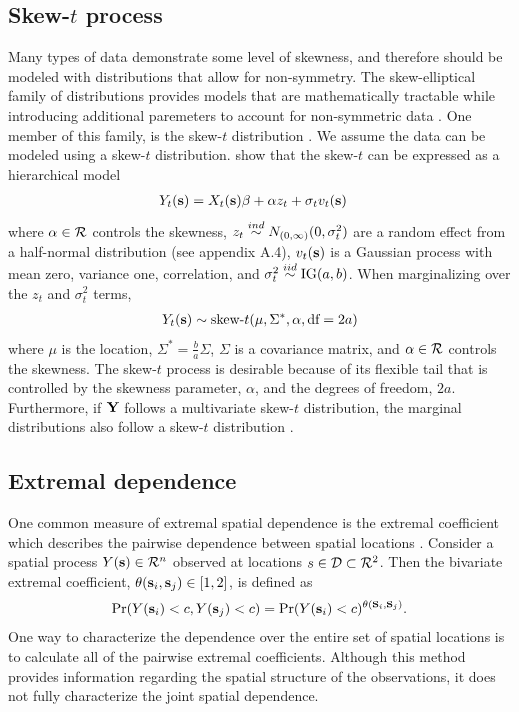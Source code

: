 \documentclass[11pt]{article}
\begin{document}
\subsection{Skew-$t$ process}\label{s:data}
Many types of data demonstrate some level of skewness, and therefore should be modeled with distributions that allow for non-symmetry.
The skew-elliptical family of distributions provides models that are mathematically tractable while introducing additional paremeters to account for non-symmetric data \citep{Genton2004}.
One member of this family, is the skew-$t$ distribution \citep{Azzalini2003}.
We assume the data can be modeled using a skew-$t$ distribution.
\citet{Zhang2010} show that the skew-$t$ can be expressed as a hierarchical model
\begin{align} \label{eq:fullmodel}
  Y_t(\mbox{\bf s}) &= X_t(\mbox{\bf s}) \beta + \alpha z_t + \sigma_t v_t(\mbox{\bf s})
\end{align}
where $\alpha \in {\cal R}$ controls the skewness, $z_{t} \stackrel{ind}{\sim} N_{(0, \infty)}(0, \sigma^2_t)$ are a random effect from a half-normal distribution (see appendix A.4), $v_t(\mbox{\bf s})$ is a Gaussian process with mean zero, variance one, \Matern correlation, and $\sigma^2_t \stackrel{iid}{\sim} \text{IG}(a, b)$.
When marginalizing over the $z_t$ and $\sigma^2_t$ terms,
\begin{align*}
  Y_t(\mbox{\bf s}) \sim \text{skew-}t (\mu, \Sigma^*, \alpha, \text{df} = 2a)
\end{align*}
where $\mu$ is the location, $\Sigma^* = \frac{ b }{ a } \Sigma$, $\Sigma$ is a \Matern covariance matrix, and $\alpha \in {\cal R}$ controls the skewness.
The skew-$t$ process is desirable because of its flexible tail that is controlled by the skewness parameter, $\alpha$, and the degrees of freedom, $2a$.
Furthermore, if $\mbox{\bf Y}$ follows a multivariate skew-$t$ distribution, the marginal distributions also follow a skew-$t$ distribution \citep{Azzalini2003}.

\subsection{Extremal dependence}
One common measure of extremal spatial dependence is the extremal coefficient which describes the pairwise dependence between spatial locations \citep{Smith1990}.
Consider a spatial process $Y(\mbox{\bf s}) \in {\cal R}^n$ observed at locations $s \in {\cal D} \subset {\cal R}^2$.
Then the bivariate extremal coefficient, $\theta(\mbox{\bf s}_i, \mbox{\bf s}_j) \in [1, 2]$, is defined as
\begin{align}
  \Pr(Y(\mbox{\bf s}_i) < c, Y(\mbox{\bf s}_j) < c) = \Pr(Y(\mbox{\bf s}_i) < c)^{\theta(\mbox{\bf s}_i, \mbox{\bf s}_j) }. \label{eq:extremalcoef}
\end{align}
One way to characterize the dependence over the entire set of spatial locations is to calculate all of the pairwise extremal coefficients.
Although this method provides information regarding the spatial structure of the observations, it does not fully characterize the joint spatial dependence.
\end{document}
